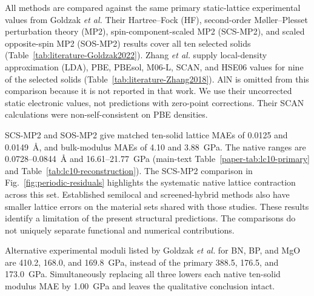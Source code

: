 \documentclass[10pt,a4paper]{article}
\begin{document}
All methods are compared against the same primary static-lattice experimental values from Goldzak \emph{et al.}\cite{Goldzak2022Solids} Their Hartree--Fock (HF), second-order M{\o}ller--Plesset perturbation theory (MP2), spin-component-scaled MP2 (SCS-MP2), and scaled opposite-spin MP2 (SOS-MP2) results cover all ten selected solids (Table~\ref{tab:literature-Goldzak2022}). Zhang \emph{et al.}\cite{Zhang2018Solids} supply local-density approximation (LDA), PBE, PBEsol, M06-L, SCAN, and HSE06 values for nine of the selected solids (Table~\ref{tab:literature-Zhang2018}). AlN is omitted from this comparison because it is not reported in that work. We use their uncorrected static electronic values, not predictions with zero-point corrections. Their SCAN calculations were non-self-consistent on PBE densities.

SCS-MP2 and SOS-MP2 give matched ten-solid lattice MAEs of 0.0125 and 0.0149~\AA{}, and bulk-modulus MAEs of 4.10 and 3.88~GPa. The native ranges are 0.0728--0.0844~\AA{} and 16.61--21.77~GPa (main-text Table~\ref{paper-tab:lc10-primary} and Table~\ref{tab:lc10-reconstruction}). The SCS-MP2 comparison in Fig.~\ref{fig:periodic-residuals} highlights the systematic native lattice contraction across this set. Established semilocal and screened-hybrid methods also have smaller lattice errors on the material sets shared with those studies. These results identify a limitation of the present structural predictions. The comparisons do not uniquely separate functional and numerical contributions.

Alternative experimental moduli listed by Goldzak \emph{et al.} for BN, BP, and MgO are 410.2, 168.0, and 169.8~GPa, instead of the primary 388.5, 176.5, and 173.0~GPa. Simultaneously replacing all three lowers each native ten-solid modulus MAE by 1.00~GPa and leaves the qualitative conclusion intact.
\end{document}

